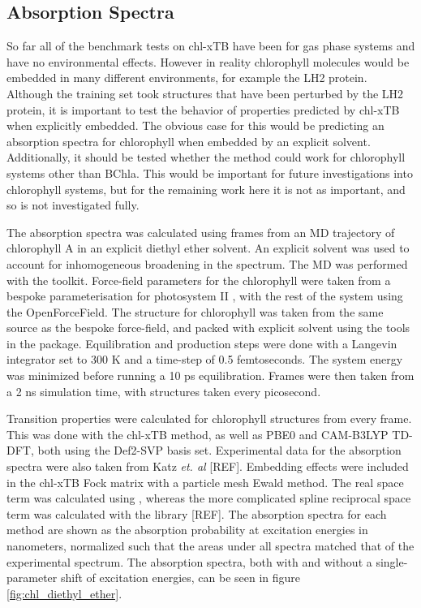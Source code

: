 \afterpartskip
\subsection{Absorption Spectra}
\label{subsec:absorption_spectra}

So far all of the benchmark tests on chl-xTB have been for gas phase systems and
have no environmental effects. However in reality chlorophyll molecules would be
embedded in many different environments, for example the LH2 protein. Although the
training set took structures that have been perturbed by the LH2 protein, it is 
important to test the behavior of properties predicted by chl-xTB when explicitly
embedded. The obvious case for this would be predicting an absorption spectra for
chlorophyll when embedded by an explicit solvent. Additionally, it should be tested
whether the method could work for chlorophyll systems other than BChla. This would
be important for future investigations into chlorophyll systems, but for the remaining
work here it is not as important, and so is not investigated fully.

The absorption spectra was calculated using frames from an MD trajectory of chlorophyll
A in an explicit diethyl ether solvent. An explicit solvent was used to account
for inhomogeneous broadening in the spectrum. The MD was performed with the
 toolkit. Force-field parameters for the chlorophyll were taken from
a bespoke parameterisation for photosystem II \cite{Zhang2012}, with the rest of
the system using the OpenForceField. The structure for chlorophyll was taken from
the same source as the bespoke force-field, and packed with explicit solvent using
the tools in the  package. Equilibration and production steps were 
done with a Langevin integrator set to 300 K  and a time-step of 0.5 femtoseconds.
The system energy was minimized before running a 10 ps equilibration. Frames were
then taken from a 2 ns simulation time, with structures taken every picosecond.

Transition properties were calculated for chlorophyll structures from every frame.
This was done with the chl-xTB method, as well as PBE0 and CAM-B3LYP TD-DFT, both
using the Def2-SVP basis set. Experimental data for the absorption spectra were 
also taken from Katz \emph{et. al} \cite{Strain1963} [REF]. Embedding effects were
included in the chl-xTB Fock matrix with a particle mesh Ewald method. The real 
space term was calculated using , whereas the more complicated spline 
reciprocal space term was calculated with the  library [REF]. The absorption 
spectra for each method are shown as the absorption probability at excitation energies
in nanometers, normalized such that the areas under all spectra matched that of 
the experimental spectrum. The absorption spectra, both with and without a single-parameter
shift of excitation energies, can be seen in figure \ref{fig:chl_diethyl_ether}.


